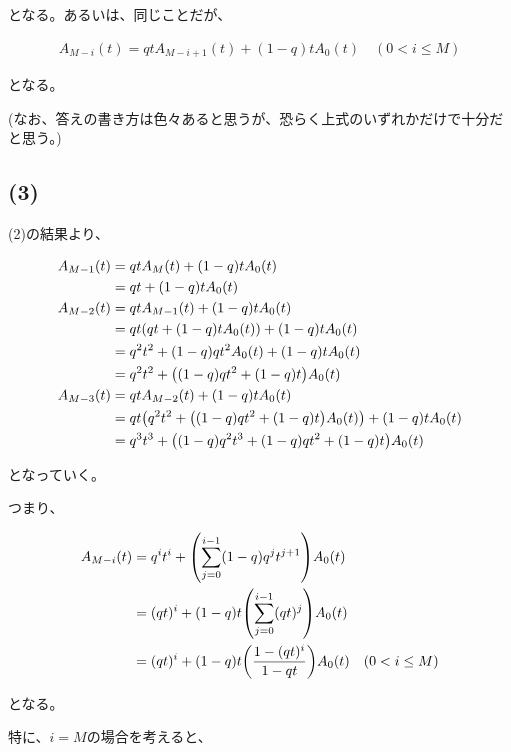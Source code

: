 \documentclass[a4paper, 10pt, dvipdfmx]{jlreq}
\begin{document}
となる。あるいは、同じことだが、

\begin{align*}
    A_{M-i}(t)=qtA_{M-i+1}(t)+(1-q)tA_0(t) \quad (0 < i \leq M)
\end{align*}

となる。

(なお、答えの書き方は色々あると思うが、恐らく上式のいずれかだけで十分だと思う。)

\subsection*{(3)}

(2)の結果より、

\begin{align*}
    A_{M-1}(t) & =qtA_{M}(t)+(1-q)tA_0(t)                                  \\
               & =qt+(1-q)tA_0(t)                                          \\
    A_{M-2}(t) & =qtA_{M-1}(t)+(1-q)tA_0(t)                                \\
               & =qt\qty(qt+(1-q)tA_0(t))+(1-q)tA_0(t)                     \\
               & =q^2t^2+(1-q)qt^2A_0(t)+(1-q)tA_0(t)                      \\
               & =q^2t^2+\qty((1-q)qt^2+(1-q)t)A_0(t)                      \\
    A_{M-3}(t) & =qtA_{M-2}(t)+(1-q)tA_0(t)                                \\
               & =qt\qty(q^2t^2+\qty((1-q)qt^2+(1-q)t)A_0(t))+(1-q)tA_0(t) \\
               & =q^3t^3+\qty((1-q)q^2t^3+(1-q)qt^2+(1-q)t)A_0(t)          \\
\end{align*}


となっていく。

つまり、

\begin{align*}
    A_{M-i}(t) & =q^it^i+\qty(\sum_{j=0}^{i-1}(1-q)q^{j}t^{j+1})A_0(t)                \\
               & =(qt)^i+(1-q)t\qty(\sum_{j=0}^{i-1}(qt)^{j})A_0(t)                   \\
               & =(qt)^i+(1-q)t\qty(\frac{1-(qt)^i}{1-qt})A_0(t) \quad (0 < i \leq M)
\end{align*}

となる。

特に、$i=M$の場合を考えると、
\end{document}
